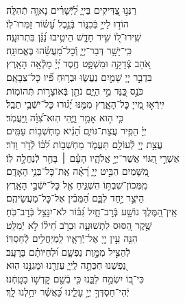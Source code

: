 \documentclass[twoside, openany, parskip=half, 11pt]{book}
\begin{document}
\begin{narrow}
רַנְּנ֣וּ צַ֭דִּיקִים בַּייָ֑ \hfill
לַ֝יְֿשָׁרִ֗ים נָאוָ֥ה תְֿהִלָּֽה׃ \\
הוֹד֣וּ לַייָ֣ בְּֿכִנּ֑וֹר \hfill בְּֿנֵ֥בֶל עָ֝שׂ֗וֹר זַמְּרוּ־לֽוֹ׃ \\
שִֽׁירוּ־ל֭וֹ שִׁ֣יר חָדָ֑שׁ \hfill הֵיטִ֥יבוּ נַ֝גֵּ֗ן בִּתְרוּעָֽה׃ \\
כִּֽי־יָשָׁ֥ר דְּבַר־יְיָ֑ \hfill וְֿכׇל־מַ֝עֲשֵׂ֗הוּ בֶּאֱמוּנָֽה׃ \\
אֹ֭הֵב צְֿדָקָ֣ה וּמִשְׁפָּ֑ט \hfill חֶ֥סֶד יְ֝יָ֗ מָלְֿאָ֥ה הָאָֽרֶץ׃ \\
בִּדְבַ֣ר יְיָ֭ שָׁמַ֣יִם נַעֲשׂ֑וּ \hfill וּבְר֥וּחַ פִּ֗֝יו כׇּל־צְבָאָֽם׃ \\
כֹּנֵ֣ס כַּ֭נֵּד מֵ֣י הַיָּ֑ם \hfill נֹתֵ֖ן בְּֿאוֹצָר֣וֹת תְּֿהוֹמֽוֹת׃ \\
יִֽירְֿא֣וּ מֵ֭ייָ כׇּל־הָאָ֑רֶץ \hfill מִמֶּ֥נּוּ יָ֝ג֗וּרוּ כׇּל־יֹשְֿׁבֵ֥י תֵבֵֽל׃ \\
כִּ֤י ה֣וּא אָמַ֣ר וַיֶּ֑הִי \hfill הֽוּא־צִ֝וָּ֗ה וַֽיַּעֲמֹֽד׃ \\
יְיָ֗ הֵפִ֥יר עֲצַת־גּוֹיִ֑ם \hfill הֵ֝נִ֗יא מַחְשְׁב֥וֹת עַמִּֽים׃ \\
עֲצַ֣ת יְיָ֭ לְֿעוֹלָ֣ם תַּעֲמֹ֑ד \hfill מַחְשְׁב֥וֹת לִ֝בּ֗וֹ לְֿדֹ֣ר וָדֹֽר׃ \\
אַשְׁרֵ֣י הַ֭גּוֹי אֲשֶׁר־יְיָ֣ אֱלֹהָ֑יו \hfill הָעָ֓ם ׀ בָּחַ֖ר לְֿנַחֲלָ֣ה לֽוֹ׃ \\
מִ֭שָּׁמַיִם הִבִּ֣יט יְיָ֑ \hfill רָ֝אָ֗ה אֶֽת־כׇּל־בְּנֵ֥י הָאָדָֽם׃ \\
מִֽמְּכוֹן־שִׁבְתּ֥וֹ הִשְׁגִּ֑יחַ \hfill אֶ֖ל כׇּל־יֹשְֿׁבֵ֣י הָאָֽרֶץ׃ \\
הַיֹּצֵ֣ר יַ֣חַד לִבָּ֑ם \hfill הַ֝מֵּבִ֗ין אֶל־כׇּל־מַעֲשֵׂיהֶֽם׃ \\
אֵֽין־הַ֭מֶּלֶךְ נוֹשָׁ֣ע בְּֿרׇב־חָ֑יִל \hfill גִּ֝בּ֗וֹר לֹא־יִנָּצֵ֥ל בְּֿרׇב־כֹּֽחַ׃ \\
שֶׁ֣קֶר הַ֭סּוּס לִתְשׁוּעָ֑ה \hfill וּבְרֹ֥ב חֵ֝יל֗וֹ לֹ֣א יְֿמַלֵּֽט׃ \\
הִנֵּ֤ה עֵ֣ין יְיָ֭ אֶל־יְֿרֵאָ֑יו \hfill לַֽמְיַחֲלִ֥ים לְֿחַסְדּֽוֹ׃ \\
לְֿהַצִּ֣יל מִמָּ֣וֶת נַפְשָׁ֑ם \hfill וּ֝לְחַיּוֹתָ֗ם בָּרָעָֽב׃ \\
נַ֭פְשֵׁנוּ חִכְּתָ֣ה לַֽייָ֑ \hfill עֶזְרֵ֖נוּ וּמָגִנֵּ֣נוּ הֽוּא׃ \\
כִּי־ב֭וֹ יִשְׂמַ֣ח לִבֵּ֑נוּ \hfill כִּ֤י בְֿשֵׁ֖ם קׇדְשׁ֣וֹ בָטָֽחְֿנוּ׃ \\
יְֿהִי־חַסְדְּךָ֣ יְיָ֣ עָלֵ֑ינוּ \hfill כַּ֝אֲשֶׁ֗ר יִחַ֥לְנוּ לָֽךְ׃ \\



\end{narrow}
\end{document}
